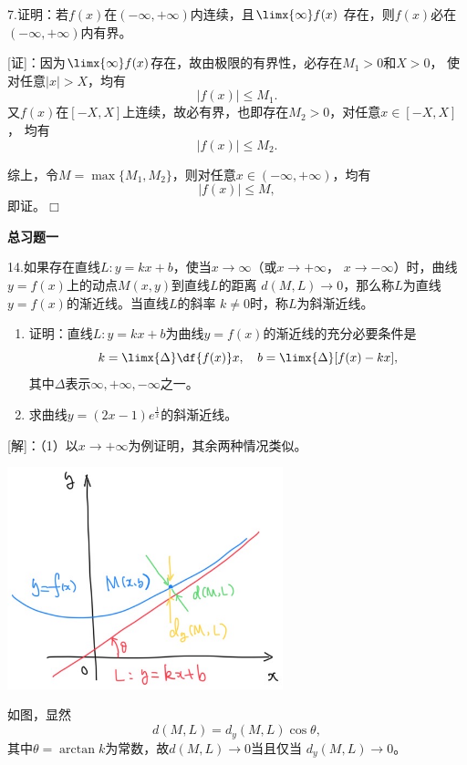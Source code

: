 \bigskip

7.证明：若$f(x)$在$(-\infty,+\infty)$内连续，且$\limx{\infty}f(x)$
存在，则$f(x)$必在$(-\infty,+\infty)$内有界。

[证]：因为$\limx{\infty}f(x)$存在，故由极限的有界性，必存在$M_1>0$和$X>0$，
使对任意$|x|>X$，均有
$$|f(x)|\leq M_1.$$
又$f(x)$在$[-X,X]$上连续，故必有界，也即存在$M_2>0$，对任意$x\in[-X,X]$，
均有
$$|f(x)|\leq M_2.$$

综上，令$M=\max\{M_1,M_2\}$，则对任意$x\in(-\infty,+\infty)$，均有
$$|f(x)|\leq M,$$
即证。\hfill$\Box$

\begin{center}
	\bf 总习题一
\end{center}

\bigskip

14.如果存在直线$L:y=kx+b$，使当$x\to\infty$（或$x\to+\infty$，
$x\to-\infty$）时，曲线$y=f(x)$上的动点$M(x,y)$到直线$L$的距离
$d(M,L)\to 0$，那么称$L$为直线$y=f(x)$的渐近线。当直线$L$的斜率
$k\ne 0$时，称$L$为斜渐近线。
\begin{enumerate}[(1)]
  \setlength{\itemindent}{1cm}
  \item 证明：直线$L:y=kx+b$为曲线$y=f(x)$的渐近线的充分必要条件是
  $$k=\limx{\Delta}\df{f(x)}x,\quad
  b=\limx{\Delta}[f(x)-kx],$$
  其中$\Delta$表示$\infty,+\infty,-\infty$之一。
  \item 求曲线$y=(2x-1)e^{\frac1x}$的斜渐近线。
\end{enumerate}

[解]：（1）以$x\to+\infty$为例证明，其余两种情况类似。

\begin{center}
	\includegraphics[width=8cm]{./images/ch1/kxb.jpg}
\end{center}

如图，显然
$$d(M,L)=d_y(M,L)\cos\theta,$$
其中$\theta=\arctan k$为常数，故$d(M,L)\to 0$当且仅当
$d_y(M,L)\to 0$。


